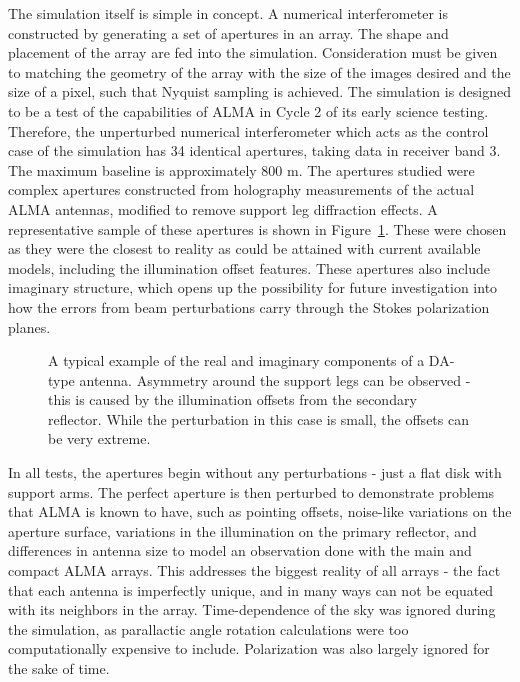\documentclass[11pt]{article}
\begin{document}
The simulation itself is simple in concept. A numerical interferometer is 
constructed by generating a set of apertures in an array. The shape and 
placement of the array are fed into the simulation. Consideration must be given 
to matching the geometry of the array with the size of the images desired and 
the size of a pixel, such that Nyquist sampling is achieved. The simulation is 
designed to be a test of the capabilities of ALMA in Cycle 2 of its early 
science testing. Therefore, the unperturbed numerical interferometer which acts 
as the control case of the simulation has 34 identical apertures, taking data 
in receiver band 3. The maximum baseline is approximately 800 m.
The apertures studied were complex apertures constructed from holography 
measurements of the actual ALMA antennas, modified to remove support leg 
diffraction effects. A representative sample of these apertures is shown in
Figure~\ref{fig:apertures}. These were chosen as they were the closest to 
reality as could be attained with current available models, including the 
illumination offset features. These apertures also include imaginary structure, 
which opens up the possibility for future investigation into how the
errors from beam perturbations carry through the Stokes polarization planes.

\begin{figure}
    \centering
    \quad
    \caption{
        A typical example of the real and imaginary components of a DA-type 
        antenna. Asymmetry around the support legs can be observed - this is 
        caused by the illumination offsets from the secondary reflector. While 
        the perturbation in this case is small, the offsets can be very 
        extreme.  }
    \label{fig:apertures}
\end{figure}

In all tests, the apertures begin without any perturbations - just a flat disk 
with support arms. The perfect aperture is then perturbed to demonstrate 
problems that ALMA is known to have, such as pointing offsets,
noise-like variations on the aperture surface, variations in the illumination 
on the primary reflector, and differences in antenna size to model an 
observation done with the main and compact ALMA arrays. This addresses the 
biggest reality of all arrays - the fact that each antenna is imperfectly 
unique, and in many ways can not be equated with its neighbors in the array.
Time-dependence of the sky was ignored during the simulation, as parallactic 
angle rotation calculations were too computationally expensive to include.  
Polarization was also largely ignored for the sake of time.
\end{document}
